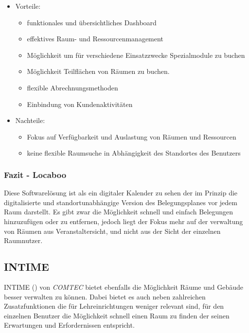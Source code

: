 \begin{itemize}
	\item Vorteile:
		\begin{itemize}
			\item funktionales und übersichtliches Dashboard
			\item effektives Raum- und Ressourcenmanagement
			\item Möglichkeit um für verschiedene Einsatzzwecke Spezialmodule zu buchen
			\item Möglichkeit Teilflächen von \bspw Räumen zu buchen.
			\item flexible Abrechnungsmethoden
			\item Einbindung von Kundenaktivitäten
		\end{itemize}
	\item Nachteile:
		\begin{itemize}
			\item Fokus auf Verfügbarkeit und Auslastung von Räumen und Ressourcen
			\item keine flexible Raumsuche in Abhängigkeit des Standortes des Benutzers
		\end{itemize}
\end{itemize}

\subsubsection{Fazit - Locaboo}
\label{sec:Fazit - Locaboo}

Diese Softwarelösung ist als ein digitaler Kalender zu sehen der im Prinzip die
digitalisierte und standortunabhängige Version des Belegungsplanes vor jedem
Raum darstellt. Es gibt zwar die Möglichkeit schnell und einfach Belegungen
hinzuzufügen oder zu entfernen, jedoch liegt der Fokus mehr auf der verwaltung
von Räumen aus Veranstaltersicht, und nicht aus der Sicht der einzelnen Raumnutzer.  

\subsection{INTIME}
\label{sec:INTIME}

INTIME (\citep{INTIME}) von \textit{COMTEC} bietet ebenfalls die Möglichkeit
Räume und Gebäude besser verwalten zu können. Dabei bietet es auch neben
zahlreichen Zusatzfunktionen die für Lehreinrichtungen weniger relevant sind,
für den einzelnen Benutzer die Möglichkeit schnell einen Raum zu finden der
seinen Erwartungen und Erfordernissen entspricht.

